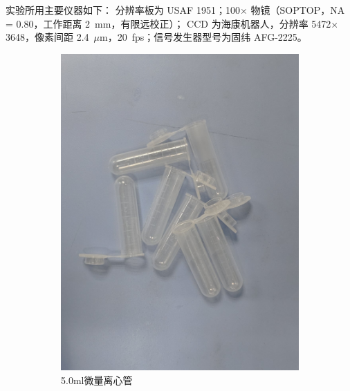 \documentclass[a4paper]{report} %
\begin{document}
实验所用主要仪器如下：
分辨率板为 USAF 1951；100$\times$ 物镜（SOPTOP，NA = 0.80，工作距离 2~mm，有限远校正）；
CCD 为海康机器人，分辨率 5472$\times$3648，像素间距 2.4~$\mu$m，20~fps；信号发生器型号为固纬 AFG-2225。
\begin{figure}[htbp]
    \centering
    \begin{subfigure}{0.22\textwidth}
        \includegraphics[width=\linewidth]{5.0ml微量离心管.jpg}
        \caption{5.0ml微量离心管}
    \end{subfigure}
    \begin{subfigure}{0.22\textwidth}

\end{subfigure}
\end{figure}
\end{document}
